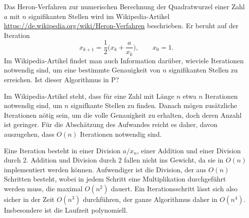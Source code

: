 Das Heron-Verfahren zur numerischen Berechnung der Quadratwurzel einer Zahl
$a$ mit $n$ signifikanten Stellen wird im Wikipedia-Artikel
\url{https://de.wikipedia.org/wiki/Heron-Verfahren}
beschrieben.
Er beruht auf der Iteration
\[
x_{k+1}= \frac12\biggl(x_k+\frac{a}{x_k}\biggr),\qquad x_0=1.
\]
Im Wikipedia-Artikel findet man auch Information darüber, wieviele
Iterationen notwendig sind, um eine bestimmte Genauigkeit von $n$ signifikanten
Stellen zu erreichen.
Ist dieser Algorithmus in P?


\begin{loesung}
Im Wikipedia-Artikel steht, dass für eine Zahl mit Länge $n$ etwa $n$
Iterationen notwendig sind, um $n$ signifkante Stellen zu finden.
Danach mögen zusätzliche Iterationen nötig sein, um die volle Genauigkeit
zu erhalten, doch deren Anzahl ist geringer.
Für die Abschätzung des Aufwandes reicht es daher, davon auszugehen, dass
$O(n)$ Iterationen notwendig sind.

Eine Iteration besteht in einer Division $a/x_n$, einer Addition und
einer Division durch $2$. 
Addition und Division durch $2$
fallen nicht ins Gewicht, da sie in $O(n)$
implementiert werden können.
Aufwendiger ist die Division, der aus $O(n)$ Schritten besteht, wobei
in jedem Schritt eine Multiplikation durchgeführt werden muss, die
maximal $O(n^2)$ dauert.
Ein Iterationsschritt lässt sich also sicher in der Zeit $O(n^3)$ durchführen,
der ganze Algorithmus daher in $O(n^4)$.
Insbesondere ist die Laufzeit polynomiell.
\end{loesung}
